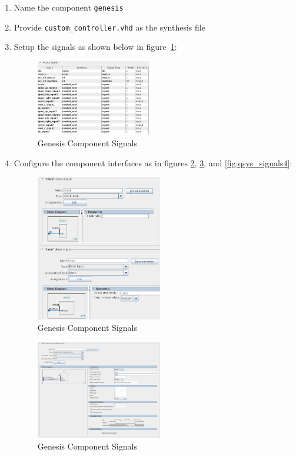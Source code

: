 \documentclass{capstonedoc}
\begin{document}
\begin{enumerate}
  \item Name the component \texttt{genesis}
  \item Provide \texttt{custom\_controller.vhd} as the synthesis file
  \item Setup the signals as shown below in figure~\ref{fig:qsys_signals}:

    \begin{figure}[h]
      \centering
      \includegraphics[width=5cm]{fig1}
      \caption{Genesis Component Signals}
      \label{fig:qsys_signals}
    \end{figure}

  \item Configure the component interfaces as in figures
    \ref{fig:qsys_signals2}, \ref{fig:qsys_signals3}, and
    \ref{fig:qsys_signals4}:

    \begin{figure}[h]
      \centering
      \includegraphics[width=5.5cm]{fig2}
      \caption{Genesis Component Signals}
      \label{fig:qsys_signals2}
    \end{figure}

    \begin{figure}[h]
      \centering
      \includegraphics[width=5.5cm]{fig3}
      \caption{Genesis Component Signals}
      \label{fig:qsys_signals3}
    \end{figure}


\end{enumerate}
\end{document}
